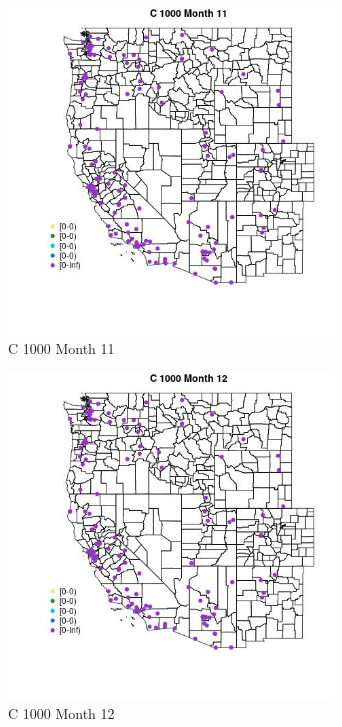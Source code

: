 \begin{figure} 
\centering  
\includegraphics[width=0.77\textwidth]{Code_Outputs/Report_ML_input_PM25_Step4_part_e_de_duplicated_aves_MapObsMo11C_1000.jpg} 
\caption{\label{fig:Report_ML_input_PM25_Step4_part_e_de_duplicated_avesMapObsMo11C_1000}C 1000 Month 11} 
\end{figure} 
 

\begin{figure} 
\centering  
\includegraphics[width=0.77\textwidth]{Code_Outputs/Report_ML_input_PM25_Step4_part_e_de_duplicated_aves_MapObsMo12C_1000.jpg} 
\caption{\label{fig:Report_ML_input_PM25_Step4_part_e_de_duplicated_avesMapObsMo12C_1000}C 1000 Month 12} 
\end{figure} 
 

